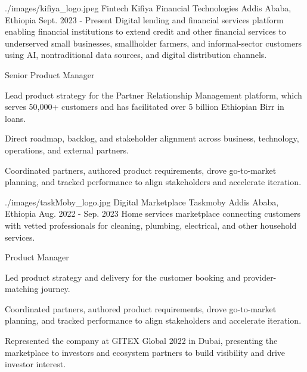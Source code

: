 \begin{cventries}

  \cventrywithlogo
    {./images/kifiya_logo.jpeg} %
    {Fintech} %
    {Kifiya Financial Technologies} %
    {Addis Ababa, Ethiopia} %
    {Sept. 2023 - Present} %
    {Digital lending and financial services platform enabling financial institutions to extend credit and other financial services to underserved small businesses, smallholder farmers, and informal-sector customers using AI, nontraditional data sources, and digital distribution channels.}
    {
      \begin{cvsubentries}
       \cvsubentry
         {Senior Product Manager}
         {}
         {
          \begin{cvitems} %
            \item {Lead product strategy for the Partner Relationship Management platform, which serves 50,000+ customers and has facilitated over 5 billion Ethiopian Birr in loans.}
            \item {Direct roadmap, backlog, and stakeholder alignment across business, technology, operations, and external partners.}
            \item {Coordinated partners, authored product requirements, drove go-to-market planning, and tracked performance to align stakeholders and accelerate iteration.}
          \end{cvitems}
         }
      \end{cvsubentries}
    }

  \cventrywithlogo
    {./images/taskMoby_logo.jpg} %
    {Digital Marketplace} %
    {Taskmoby} %
    {Addis Ababa, Ethiopia} %
    {Aug. 2022 - Sep. 2023} %
    {Home services marketplace connecting customers with vetted professionals for cleaning, plumbing, electrical, and other household services.}
    {
      \begin{cvsubentries}
       \cvsubentry
         {Product Manager}
         {}
         {
          \begin{cvitems} %
            \item {Led product strategy and delivery for the customer booking and provider-matching journey.}
            \item {Coordinated partners, authored product requirements, drove go-to-market planning, and tracked performance to align stakeholders and accelerate iteration.}
            \item {Represented the company at GITEX Global 2022 in Dubai, presenting the marketplace to investors and ecosystem partners to build visibility and drive investor interest.}
          \end{cvitems}
         }
      \end{cvsubentries}
    }


\end{cventries}
